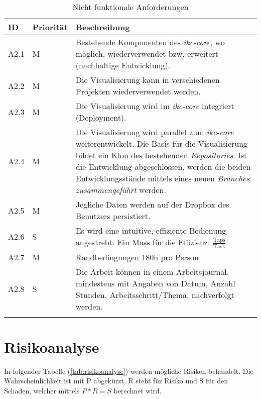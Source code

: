 \begin{longtable}{|p{1.5cm} | p{1.5cm} | p{8.1cm}|}
  \hline
    ID & Priorität & Beschreibung \\\hline
    A2.1 & M & Bestehende Komponenten des \textit{ikc-core}, wo möglich, wiederverwendet bzw. erweitert (nachhaltige Entwicklung).\\\hline
    A2.2 & M & Die Visualisierung kann in verschiedenen Projekten wiederverwendet werden.\\\hline
    A2.3 & M & Die Visualisierung wird im \textit{ikc-core} integriert (Deployment).\\\hline
    A2.4 & M & Die Visualisierung wird parallel zum \textit{ikc-core} weiterentwickelt. Die Basis für die Visualisierung bildet ein Klon des bestehenden \textit{Repositories}. Ist die Entwicklung abgeschlossen, werden die beiden Entwicklungsstände mittels eines neuen \textit{Branches} \textit{zusammengeführt} werden.\\\hline
    A2.5 & M & Jegliche Daten werden auf der Dropbox des Benutzers persistiert.\\\hline
    A2.6 & S & Es wird eine intuitive, effiziente Bedienung angestrebt. Ein Mass für die Effizienz: $\frac{\text{Taps}}{\text{Task}}$\\\hline
    A2.7 & M & Randbedingungen 180h pro Person\\\hline
    A2.8 & S & Die Arbeit können in einem Arbeitsjournal, mindestens mit Angaben von Datum, Anzahl Stunden, Arbeitsschritt/Thema, nachverfolgt werden.\\\hline
    \caption{Nicht funktionale Anforderungen}
  \label{tab:nicht-funktionale-anforderungen}
\end{longtable}

\section{Risikoanalyse}\label{risikoanalyse}

In folgender Tabelle (\autoref{tab:risikoanalyse}) werden mögliche Risiken behandelt. Die Wahrscheinlichkeit ist mit P abgekürzt, R steht für Risiko und S für den Schaden, welcher mittels $P*R=S$ berechnet wird.


